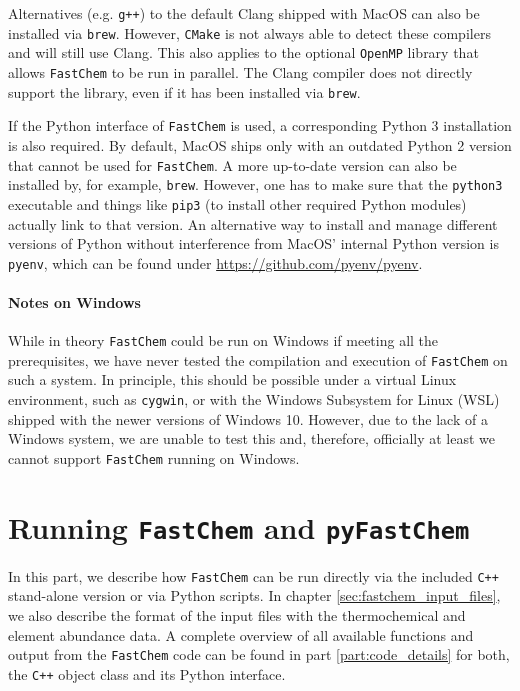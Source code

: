 \documentclass[numbers=noenddot]{fcmanual}
\newcommand{\fc}{\texttt{FastChem}\xspace}
\newcommand{\pfc}{\texttt{pyFastChem}\xspace}
\newcommand{\cpp}{\ttt{C++}\xspace}
\newcommand{\ttt}[1]{\texttt {#1}}
\begin{document}
Alternatives (e.g. \texttt{g++}) to the default Clang shipped with MacOS can also be installed via \texttt{brew}. However, \texttt{CMake} is not always able to detect these compilers and will still use Clang. This also applies to the optional \ttt{OpenMP} library that allows \fc to be run in parallel. The Clang compiler does not directly support the library, even if it has been installed via \texttt{brew}.

If the Python interface of \fc is used, a corresponding Python 3 installation is also required. By default, MacOS ships only with an outdated Python 2 version that cannot be used for \fc. A more up-to-date version can also be installed by, for example, \texttt{brew}. However, one has to make sure that the \texttt{python3} executable and things like \texttt{pip3} (to install other required Python modules) actually link to that version. An alternative way to install and manage different versions of Python without interference from MacOS' internal Python version is \texttt{pyenv}, which can be found under \url{https://github.com/pyenv/pyenv}. 


\subsection{Notes on Windows}

While in theory \fc could be run on Windows if meeting all the prerequisites, we have never tested the compilation and execution of \fc on such a system. In principle, this should be possible under a virtual Linux environment, such as \texttt{cygwin}, or with the Windows Subsystem for Linux (WSL) shipped with the newer versions of Windows 10. However, due to the lack of a Windows system, we are unable to test this and, therefore, officially at least we cannot support \fc running on Windows.


\part{Running \fc and \pfc}
\label{part:running}

In this part, we describe how \fc can be run directly via the included \cpp stand-alone version or via Python scripts. In chapter \ref{sec:fastchem_input_files}, we also describe the format of the input files with the thermochemical and element abundance data. A complete overview of all available functions and output from the \fc code can be found in part \ref{part:code_details} for both, the \cpp object class and its Python interface.
\end{document}

